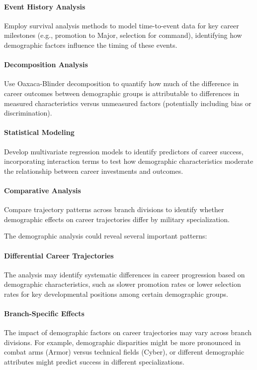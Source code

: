 \documentclass[../main.tex]{subfiles}
\begin{document}
\paragraph{Event History Analysis}
Employ survival analysis methods to model time-to-event data for key career milestones (e.g., promotion to Major, selection for command), identifying how demographic factors influence the timing of these events.

\paragraph{Decomposition Analysis}
Use Oaxaca-Blinder decomposition to quantify how much of the difference in career outcomes between demographic groups is attributable to differences in measured characteristics versus unmeasured factors (potentially including bias or discrimination).

\paragraph{Statistical Modeling}
Develop multivariate regression models to identify predictors of career success, incorporating interaction terms to test how demographic characteristics moderate the relationship between career investments and outcomes.

\paragraph{Comparative Analysis}
Compare trajectory patterns across branch divisions to identify whether demographic effects on career trajectories differ by military specialization.


The demographic analysis could reveal several important patterns:

\paragraph{Differential Career Trajectories}
The analysis may identify systematic differences in career progression based on demographic characteristics, such as slower promotion rates or lower selection rates for key developmental positions among certain demographic groups.

\paragraph{Branch-Specific Effects}
The impact of demographic factors on career trajectories may vary across branch divisions. For example, demographic disparities might be more pronounced in combat arms (Armor) versus technical fields (Cyber), or different demographic attributes might predict success in different specializations.
\end{document}
